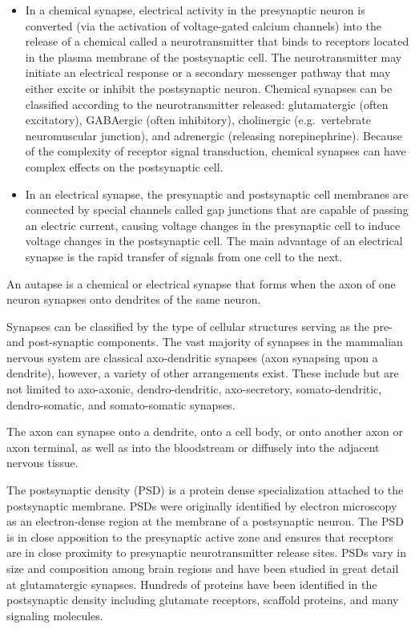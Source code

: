 \begin{itemize}
\tightlist
\item
  In a chemical synapse, electrical activity in the presynaptic neuron is converted (via the activation of voltage-gated calcium channels) into the release of a chemical called a neurotransmitter that binds to receptors located in the plasma membrane of the postsynaptic cell. The neurotransmitter may initiate an electrical response or a secondary messenger pathway that may either excite or inhibit the postsynaptic neuron. Chemical synapses can be classified according to the neurotransmitter released: glutamatergic (often excitatory), GABAergic (often inhibitory), cholinergic (e.g.~vertebrate neuromuscular junction), and adrenergic (releasing norepinephrine). Because of the complexity of receptor signal transduction, chemical synapses can have complex effects on the postsynaptic cell.
\item
  In an electrical synapse, the presynaptic and postsynaptic cell membranes are connected by special channels called gap junctions that are capable of passing an electric current, causing voltage changes in the presynaptic cell to induce voltage changes in the postsynaptic cell. The main advantage of an electrical synapse is the rapid transfer of signals from one cell to the next.
\end{itemize}

An autapse is a chemical or electrical synapse that forms when the axon of one neuron synapses onto dendrites of the same neuron.

Synapses can be classified by the type of cellular structures serving as the pre- and post-synaptic components. The vast majority of synapses in the mammalian nervous system are classical axo-dendritic synapses (axon synapsing upon a dendrite), however, a variety of other arrangements exist. These include but are not limited to axo-axonic, dendro-dendritic, axo-secretory, somato-dendritic, dendro-somatic, and somato-somatic synapses.

The axon can synapse onto a dendrite, onto a cell body, or onto another axon or axon terminal, as well as into the bloodstream or diffusely into the adjacent nervous tissue.

The postsynaptic density (PSD) is a protein dense specialization attached to the postsynaptic membrane. PSDs were originally identified by electron microscopy as an electron-dense region at the membrane of a postsynaptic neuron. The PSD is in close apposition to the presynaptic active zone and ensures that receptors are in close proximity to presynaptic neurotransmitter release sites. PSDs vary in size and composition among brain regions and have been studied in great detail at glutamatergic synapses. Hundreds of proteins have been identified in the postsynaptic density including glutamate receptors, scaffold proteins, and many signaling molecules.

